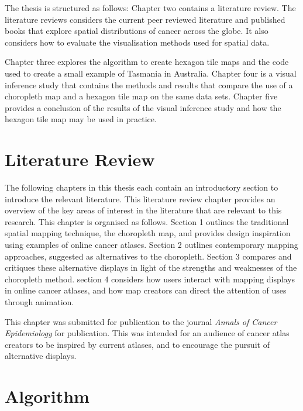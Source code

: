 \documentclass{monashthesis}
\begin{document}
The thesis is structured as follows: Chapter two contains a literature review.
The literature reviews considers the current peer reviewed literature and published books that explore spatial distributions of cancer across the globe.
It also considers how to evaluate the visualisation methods used for spatial data.

Chapter three explores the algorithm to create hexagon tile maps and the code used to create a small example of Tasmania in Australia.
Chapter four is a visual inference study that contains the methods and results that compare the use of a choropleth map and a hexagon tile map on the same data sets.
Chapter five provides a conclusion of the results of the visual inference study and how the hexagon tile map may be used in practice.

\hypertarget{ch:literature}{%
\chapter{Literature Review}\label{ch:literature}}

The following chapters in this thesis each contain an introductory section to introduce the relevant literature. This literature review chapter provides an overview of the key areas of interest in the literature that are relevant to this research. This chapter is organised as follows. Section 1 outlines the traditional spatial mapping technique, the choropleth map, and provides design inspiration using examples of online cancer atlases. Section 2 outlines contemporary mapping approaches, suggested as alternatives to the choropleth. Section 3 compares and critiques these alternative displays in light of the strengths and weaknesses of the choropleth method. section 4 considers how users interact with mapping displays in online cancer atlases, and how map creators can direct the attention of uses through animation.

This chapter was submitted for publication to the journal \emph{Annals of Cancer Epidemiology} for publication. This was intended for an audience of cancer atlas creators to be inspired by current atlases, and to encourage the pursuit of alternative displays.





\hypertarget{ch:algorithm}{%
\chapter{Algorithm}\label{ch:algorithm}}
\end{document}

